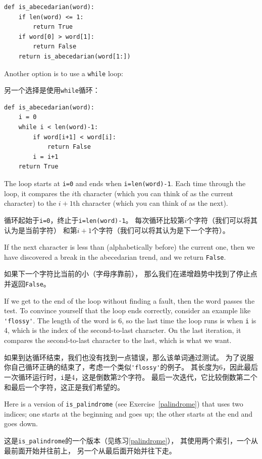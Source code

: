 \documentclass[10pt]{book}
\begin{document}
\begin{CJK}{UTF8}{gbsn}
\begin{verbatim}
def is_abecedarian(word):
    if len(word) <= 1:
        return True
    if word[0] > word[1]:
        return False
    return is_abecedarian(word[1:])
\end{verbatim}

Another option is to use a {\tt while} loop:

另一个选择是使用{\tt while}循环：

\begin{verbatim}
def is_abecedarian(word):
    i = 0
    while i < len(word)-1:
        if word[i+1] < word[i]:
            return False
        i = i+1
    return True
\end{verbatim}
%
The loop starts at {\tt i=0} and ends when {\tt i=len(word)-1}.  Each
time through the loop, it compares the $i$th character (which you can
think of as the current character) to the $i+1$th character (which you
can think of as the next).

循环起始于{\tt i=0}，终止于{\tt i=len(word)-1}。
每次循环比较第$i$个字符（我们可以将其认为是当前字符）
和第$i+1$个字符（我们可以将其认为是下一个字符）。

If the next character is less than (alphabetically before) the current
one, then we have discovered a break in the abecedarian trend, and
we return {\tt False}.

如果下一个字符比当前的小（字母序靠前），
那么我们在递增趋势中找到了停止点并返回{\tt False}。

If we get to the end of the loop without finding a fault, then the
word passes the test.  To convince yourself that the loop ends
correctly, consider an example like \verb"'flossy'".  The
length of the word is 6, so
the last time the loop runs is when {\tt i} is 4, which is the
index of the second-to-last character.  On the last iteration,
it compares the second-to-last character to the last, which is
what we want.

如果到达循环结束，我们也没有找到一点错误，那么该单词通过测试。
为了说服你自己循环正确的结束了，考虑一个类似\verb"'flossy'"的例子。
其长度为6，因此最后一次循环运行时，{\tt i}是4，这是倒数第2个字符。
最后一次迭代，它比较倒数第二个和最后一个字符，这正是我们希望的。

Here is a version of \verb"is_palindrome" (see
Exercise~\ref{palindrome}) that uses two indices; one starts at the
beginning and goes up; the other starts at the end and goes down.

这是\verb"is_palindrome"的一个版本（见练习\ref{palindrome}），
其使用两个索引，一个从最前面开始并往前上，
另一个从最后面开始并往下走。


\end{CJK}
\end{document}
